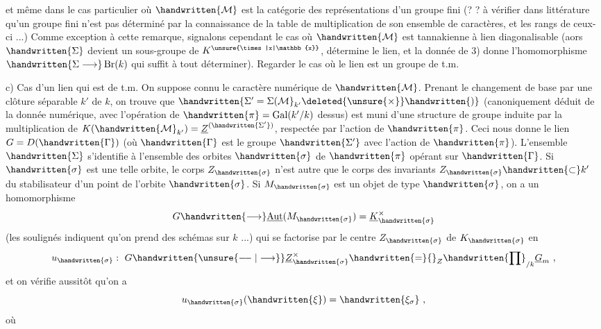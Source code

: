 et même dans le cas particulier où $\handwritten{\mathcal{M}}$ est la catégorie des représentations d'un groupe fini (? ? à vérifier dans littérature qu'un groupe fini n'est pas déterminé par la connaissance de la table de multiplication de  son ensemble de caractères, et les rangs de ceux-ci ...) Comme exception à cette remarque, signalons cependant le cas où $\handwritten{\mathcal{M}}$ est tannakienne à lien diagonalisable (aors $\handwritten{\Sigma}$ devient un sous-groupe de $K^{\unsure{\times|x|\mathbb{x}}}$,  détermine le lien, et la donnée de 3) donne l'homomorphisme $\handwritten{\Sigma\longrightarrow}\operatorname{Br}(k)$ qui suffit à tout déterminer). Regarder le cas où le lien est un groupe de t.m.

c) Cas d'un lien qui est de t.m. On suppose connu le caractère numérique  de $\handwritten{\mathcal{M}}$. Prenant le changement de base par une clôture séparable $k'$ de $k$, on trouve que $\handwritten{\Sigma'=\Sigma(\mathcal{M}}_{k'}\deleted{\unsure{\times}}\handwritten{)}$ (canoniquement déduit de la donnée numérique, avec l'opération de $\handwritten{\pi}=\operatorname{Gal}(k'/k)$ dessus) est muni d'une structure de groupe induite par la multiplication de $K(\handwritten{\mathcal{M}}_{k'})=\underline{Z}^{(\handwritten{\Sigma'})}$,  respectée par l'action de $\handwritten{\pi}$. Ceci nous donne le lien $G=D(\handwritten{\Gamma})$ (où $\handwritten{\Gamma}$ est le groupe $\handwritten{\Sigma'}$ avec l'action de $\handwritten{\pi}$). L'ensemble $\handwritten{\Sigma}$ s'identifie à l'ensemble des orbites $\handwritten{\sigma}$ de $\handwritten{\pi}$ opérant sur $\handwritten{\Gamma}$. Si $\handwritten{\sigma}$ est une telle orbite, le corps $Z_{\handwritten{\sigma}}$ n'est autre que le corps des invariants $Z_{\handwritten{\sigma}}\handwritten{\subset}k'$ du stabilisateur d'un point de l'orbite $\handwritten{\sigma}$. Si $M_{\handwritten{\sigma}}$ est un objet de type $\handwritten{\sigma}$, on a un homomorphisme
\[
G\handwritten{\longrightarrow}\underline{\operatorname{Aut}}(M_{\handwritten{\sigma}})=\underline{K}_{\handwritten{\sigma}}^\times
\]
(les soulignés indiquent qu'on prend des schémas sur $k$ ...) qui se factorise par le centre $Z_{\handwritten{\sigma}}$ de $K_{\handwritten{\sigma}}$ en
\[
u_{\handwritten{\sigma}}:\ G\handwritten{\unsure{\mathrel{-\! -}|\longrightarrow}}\underline{Z}_{\handwritten{\sigma}}^\times\handwritten{=}{}_{Z}\handwritten{\prod}_{/k}\underline{G}_m\ ,
\]
et on vérifie aussitôt qu'on a
\[
u_{\handwritten{\sigma}}(\handwritten{\xi})=\handwritten{\xi_\sigma}\ ,
\]
où
